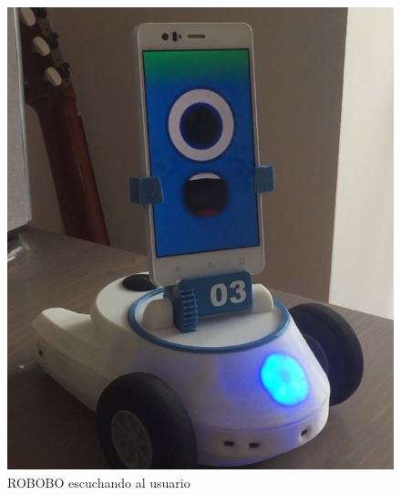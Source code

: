 \begin{figure}
\centering
\begin{minipage}{0.45\textwidth}
\centering
\includegraphics[width=1\linewidth]{imagenes/simon_surprised.png}
\caption{ROBOBO escuchando al usuario}
\label{fig:simon-surprised}


\end{minipage}
\end{figure}
